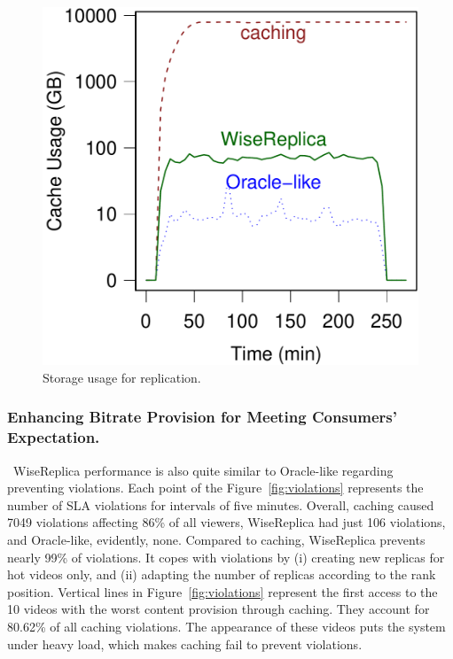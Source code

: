 \begin{figure}[htbp]
\begin{minipage}[t]{0.48\linewidth}
     \includegraphics[width=.95\textwidth]{inputs/img/cache_usage}
		\caption{Storage usage for replication.}
		\label{fig:cache_usage_for_replication}
	\end{minipage}
\end{figure}

\subsubsection{Enhancing Bitrate Provision for Meeting Consumers' Expectation.}

\ WiseReplica performance is also quite similar to Oracle-like regarding preventing violations. Each point of the Figure~\ref{fig:violations} represents the number of SLA violations for intervals of five minutes. Overall, caching caused 7049 violations affecting 86\% of all viewers, WiseReplica had just 106 violations, and Oracle-like, evidently, none. Compared to caching, WiseReplica prevents nearly 99\% of violations. It copes with violations by (i) creating new replicas for hot videos only, and (ii) adapting the number of replicas according to the rank position. Vertical lines in Figure~\ref{fig:violations} represent the first access to the 10 videos with the worst content provision through caching. They account for 80.62\% of all caching violations. The appearance of these videos puts the system under heavy load, which makes caching fail to prevent violations.

